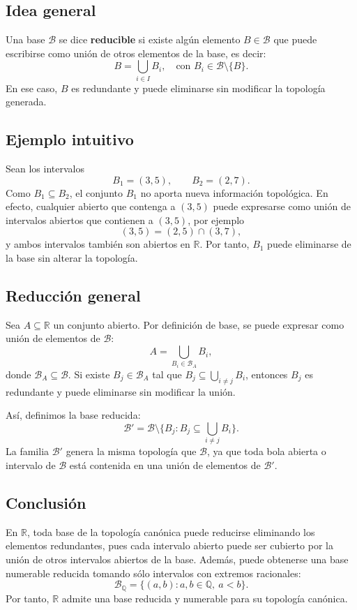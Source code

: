 \documentclass[12pt]{article}
\begin{document}
\subsection*{Idea general}
Una base $\mathcal{B}$ se dice \textbf{reducible} si existe algún elemento
$B \in \mathcal{B}$ que puede escribirse como unión de otros elementos de la base, es decir:
\[
B = \bigcup_{i \in I} B_i, \quad \text{con } B_i \in \mathcal{B} \setminus \{B\}.
\]
En ese caso, $B$ es redundante y puede eliminarse sin modificar la topología generada.

\subsection*{Ejemplo intuitivo}
Sean los intervalos
\[
B_1 = (3,5), \qquad B_2 = (2,7).
\]
Como $B_1 \subseteq B_2$, el conjunto $B_1$ no aporta nueva información topológica.
En efecto, cualquier abierto que contenga a $(3,5)$ puede expresarse como unión
de intervalos abiertos que contienen a $(3,5)$, por ejemplo
\[
(3,5) = (2,5) \cap (3,7),
\]
y ambos intervalos también son abiertos en $\mathbb{R}$.
Por tanto, $B_1$ puede eliminarse de la base sin alterar la topología.

\subsection*{Reducción general}
Sea $A \subseteq \mathbb{R}$ un conjunto abierto.
Por definición de base, se puede expresar como unión de elementos de $\mathcal{B}$:
\[
A = \bigcup_{B_i \in \mathcal{B}_A} B_i,
\]
donde $\mathcal{B}_A \subseteq \mathcal{B}$.
Si existe $B_j \in \mathcal{B}_A$ tal que $B_j \subseteq \bigcup_{i \ne j} B_i$,
entonces $B_j$ es redundante y puede eliminarse sin modificar la unión.

Así, definimos la base reducida:
\[
\mathcal{B}' = \mathcal{B} \setminus \{B_j : B_j \subseteq \bigcup_{i \ne j} B_i\}.
\]
La familia $\mathcal{B}'$ genera la misma topología que $\mathcal{B}$,
ya que toda bola abierta o intervalo de $\mathcal{B}$ está contenida en una unión de elementos de $\mathcal{B}'$.

\subsection*{Conclusión}
En $\mathbb{R}$, toda base de la topología canónica puede reducirse eliminando los elementos redundantes,
pues cada intervalo abierto puede ser cubierto por la unión de otros intervalos abiertos de la base.
Además, puede obtenerse una base numerable reducida tomando sólo intervalos con extremos racionales:
\[
\mathcal{B}_\mathbb{Q} = \{(a,b) : a,b \in \mathbb{Q},\ a<b\}.
\]
Por tanto, $\mathbb{R}$ admite una base reducida y numerable para su topología canónica.
\end{document}
